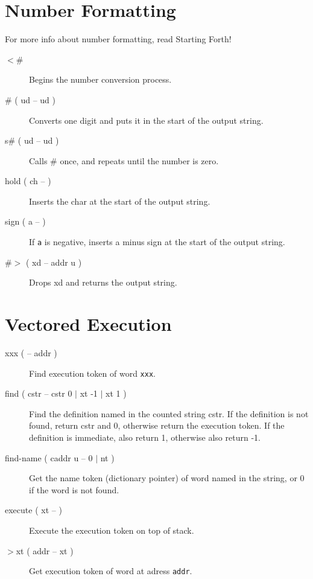 \section{Number Formatting}

For more info about number formatting, read Starting Forth!

\begin{description}

\item[$<$\#]\index{$<$\#} Begins the number conversion process.
\item[\# ( ud -- ud )]\index{\#} Converts one digit and puts it in the start of the output string.
\item[s\# ( ud -- ud )] Calls \# once, and repeats until the number is zero.
\item[hold ( ch -- )] Inserts the char at the start of the output string.
\item[sign ( a -- )] If \texttt{a} is negative, inserts a minus sign at the start of the output string.
\item[\#$>$ ( xd -- addr u )]\index{\#$>$} Drops xd and returns the output string.

\end{description}

\section{Vectored Execution}

\begin{description}
\item[\textquotesingle{} xxx ( -- addr )] Find execution token of word \texttt{xxx}.
\item[find ( cstr -- cstr 0 $\vert$ xt -1 $\vert$ xt 1 )] Find the definition named in the counted string cstr. If the definition is not found, return cstr and 0, otherwise return the execution token. If the definition is immediate, also return 1, otherwise also return -1.
\item[find-name ( caddr u -- 0 $\vert$ nt )] Get the name token (dictionary pointer) of word named in the string, or 0 if the word is not found.
\item[execute ( xt -- )] Execute the execution token on top of stack.
\item[$>$xt ( addr -- xt )] Get execution token of word at adress \texttt{addr}.

\end{description}

